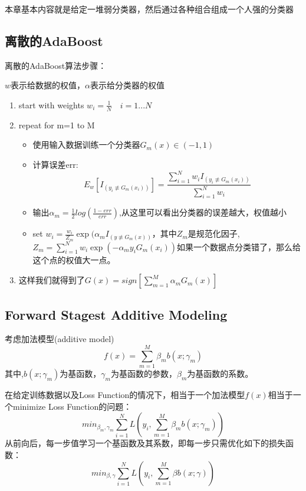 	本章基本内容就是给定一堆弱分类器，然后通过各种组合组成一个人强的分类器
	\subsection{离散的AdaBoost}
	离散的AdaBoost算法步骤：\boldmath  %

	$w$表示给数据的权值，$\alpha$表示给分类器的权值

	\begin{enumerate}		
		\item start with weights $w_i = \frac{1}{N} \quad i=1...N$
		\item repeat for m=1 to M
			\begin{itemize}
				\item 使用输入数据训练一个分类器$G_m(x) \in (-1,1)$
				\item 计算误差err:
					\begin{equation*}
						E_w[I_(y_i\not \equiv G_m(x_i))]=\frac{\sum_{i=1}^{N}w_i I_(y_i\not \equiv G_m(x_i))}{\sum_{i=1}^{N}w_i}
					\end{equation*}
				\item 输出$\alpha_m = \frac{1}{2}log(\frac{1-err}{err})$,从这里可以看出分类器的误差越大，权值越小
				\item set $w_i = \frac{w_i}{Z_m} \exp(\alpha_m I_(y\not \equiv G_m(x))$，其中$Z_m$是规范化因子,\newline
				$Z_m=\sum_{i=1}^{N}w_i \exp(-\alpha_m y_i G_m(x_i))$如果一个数据点分类错了，那么给这个点的权值大一点。
			\end{itemize}
		\item 这样我们就得到了$G(x)=sign[\sum_{m=1}^{M}\alpha_m G_m(x)]$
	\end{enumerate}
	
	
	\subsection{Forward Stagest Additive Modeling}

	考虑加法模型(additive model)\boldmath
	\begin{equation}
		f(x)=\sum_{m=1}^{M}\beta_{m}b(x;\gamma_{m})
	\end{equation}
	其中,$b(x;\gamma_{m})$为基函数，$\gamma_m$为基函数的参数，$\beta_m$为基函数的系数。

	在给定训练数据以及Loss Function的情况下，相当于一个加法模型$f(x)$相当于一个minimize Loss Function的问题：
	\begin{equation}
		min_{\beta_m,\gamma_m} \sum_{i=1}^{N}L(y_i,\sum_{m=1}^{M}\beta_{m}b(x;\gamma_{m}))
	\end{equation}
	从前向后，每一步值学习一个基函数及其系数，即每一步只需优化如下的损失函数：
	\begin{equation}
		min_{\beta,\gamma} \sum_{i=1}^{N}L(y_i,\sum_{m=1}^{M}\beta b(x;\gamma))
	\end{equation}
	\newline
	\newline


